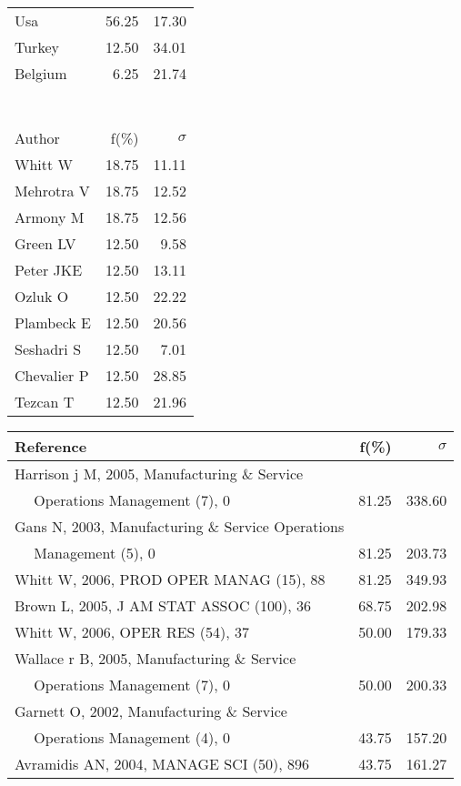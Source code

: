 \documentclass[a4paper,11pt]{report}
\begin{document}
\begin{landscape}
\begin{table}[!ht]
{\begin{tabular}{|l r r|}
Usa & 56.25 & 17.30\\
Turkey & 12.50 & 34.01\\
Belgium & 6.25 & 21.74\\
 &  & \\
 &  & \\
 &  & \\
 &  & \\
 &  & \\
 &  & \\
 &  & \\
\hline
\hline
Author & f(\%) & $\sigma$\\
\hline
Whitt W & 18.75 & 11.11\\
Mehrotra V & 18.75 & 12.52\\
Armony M & 18.75 & 12.56\\
Green LV & 12.50 & 9.58\\
Peter JKE & 12.50 & 13.11\\
Ozluk O & 12.50 & 22.22\\
Plambeck E & 12.50 & 20.56\\
Seshadri S & 12.50 & 7.01\\
Chevalier P & 12.50 & 28.85\\
Tezcan T & 12.50 & 21.96\\
\hline
\end{tabular}
}
{\scriptsize\begin{tabular}{|l r r|}
\hline
Reference & f(\%) & $\sigma$\\
\hline
Harrison j M, 2005, Manufacturing \& Service &  & \\
$\quad$ Operations Management (7), 0 & 81.25 & 338.60\\
Gans N, 2003, Manufacturing \& Service Operations &  & \\
$\quad$ Management (5), 0 & 81.25 & 203.73\\
Whitt W, 2006, PROD OPER MANAG (15), 88 & 81.25 & 349.93\\
Brown L, 2005, J AM STAT ASSOC (100), 36 & 68.75 & 202.98\\
Whitt W, 2006, OPER RES (54), 37 & 50.00 & 179.33\\
Wallace r B, 2005, Manufacturing \& Service &  & \\
$\quad$ Operations Management (7), 0 & 50.00 & 200.33\\
Garnett O, 2002, Manufacturing \& Service &  & \\
$\quad$ Operations Management (4), 0 & 43.75 & 157.20\\
Avramidis AN, 2004, MANAGE SCI (50), 896 & 43.75 & 161.27\\

\end{tabular}}
\end{table}
\end{landscape}
\end{document}
